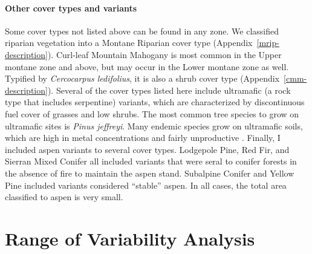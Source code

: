 \paragraph{Other cover types and variants} Some cover types not listed above can be found in any zone. We classified riparian vegetation into a Montane Riparian cover type (Appendix~\ref{mrip-description}). 
%
Curl-leaf Mountain Mahogany is most common in the Upper montane zone and above, but may occur in the Lower montane zone as well. Typified by \emph{Cercocarpus ledifolius}, it is also a shrub cover type (Appendix~\ref{cmm-description}). 
%
Several of the cover types listed here include ultramafic (a rock type that includes serpentine) variants, which are characterized by discontinuous fuel cover of grasses and low shrubs. The most common tree species to grow on ultramafic sites is \emph{Pinus jeffreyi}. Many endemic species grow on ultramafic soils, which are high in metal concentrations and fairly unproductive \citep{OGeen2007}.
%
Finally, I included aspen variants to several cover types. Lodgepole Pine, Red Fir, and Sierran Mixed Conifer all included variants that were seral to conifer forests in the absence of fire to maintain the aspen stand. Subalpine Conifer and Yellow Pine included variants considered ``stable'' aspen. In all cases, the total area classified to aspen is very small. 





\section{Range of Variability Analysis}

